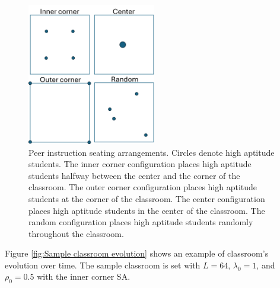  \begin{figure}[htbp!]
    \centering
    \includegraphics[width=0.5\textwidth]{figures/PI SAs.png}
    \caption[Peer instruction seating arrangements.]{ Peer instruction seating arrangements. Circles denote high aptitude students. The inner corner configuration places high aptitude students halfway between the center and the corner of the classroom. The outer corner configuration places high aptitude students at the corner of the classroom. The center configuration places high aptitude students in the center of the classroom. The random configuration places high aptitude students randomly throughout the classroom.}
    \label{fig:PI SAs}
 \end{figure}

 Figure \ref{fig:Sample classroom evolution} shows an example of classroom's evolution over time. The sample classroom is set with $L=64$, $\lambda_0 = 1$, and $\rho_0 = 0.5$ with the inner corner SA.

